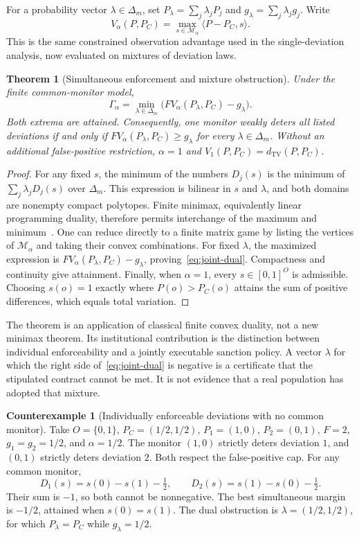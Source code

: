 \documentclass[11pt,letterpaper]{article}
\theoremstyle{plain}
\newtheorem{theorem}[proposition]{Theorem}
\theoremstyle{definition}
\newtheorem{counterexample}[proposition]{Counterexample}
\theoremstyle{remark}
\newcommand{\TV}{d_{\mathrm{TV}}}
\begin{document}
For a probability vector $\lambda\in\Delta_m$, set $P_\lambda=\sum_j\lambda_jP_j$ and $g_\lambda=\sum_j\lambda_jg_j$. Write
\[
V_\alpha(P,P_C)=\max_{s\in\mathcal M_\alpha}\langle P-P_C,s\rangle.
\]
This is the same constrained observation advantage used in the single-deviation analysis, now evaluated on mixtures of deviation laws.

\begin{theorem}[Simultaneous enforcement and mixture obstruction]\label{thm:joint-enforcement}
Under the finite common-monitor model,
\begin{equation}\label{eq:joint-dual}
\Gamma_\alpha=\min_{\lambda\in\Delta_m}
\bigl(FV_\alpha(P_\lambda,P_C)-g_\lambda\bigr).
\end{equation}
Both extrema are attained. Consequently, one monitor weakly deters all listed deviations if and only if $FV_\alpha(P_\lambda,P_C)\geq g_\lambda$ for every $\lambda\in\Delta_m$. Without an additional false-positive restriction, $\alpha=1$ and $V_1(P,P_C)=\TV(P,P_C)$.
\end{theorem}
\begin{proof}
For any fixed $s$, the minimum of the numbers $D_j(s)$ is the minimum of $\sum_j\lambda_jD_j(s)$ over $\Delta_m$. This expression is bilinear in $s$ and $\lambda$, and both domains are nonempty compact polytopes. Finite minimax, equivalently linear programming duality, therefore permits interchange of the maximum and minimum~\cite{boydconvex}. One can reduce directly to a finite matrix game by listing the vertices of $\mathcal M_\alpha$ and taking their convex combinations. For fixed $\lambda$, the maximized expression is $FV_\alpha(P_\lambda,P_C)-g_\lambda$, proving~\eqref{eq:joint-dual}. Compactness and continuity give attainment. Finally, when $\alpha=1$, every $s\in[0,1]^O$ is admissible. Choosing $s(o)=1$ exactly where $P(o)>P_C(o)$ attains the sum of positive differences, which equals total variation.
\end{proof}

The theorem is an application of classical finite convex duality, not a new minimax theorem. Its institutional contribution is the distinction between individual enforceability and a jointly executable sanction policy. A vector $\lambda$ for which the right side of~\eqref{eq:joint-dual} is negative is a certificate that the stipulated contract cannot be met. It is not evidence that a real population has adopted that mixture.

\begin{counterexample}[Individually enforceable deviations with no common monitor]\label{ex:pairwise-enforcement}
Take $O=\{0,1\}$, $P_C=(1/2,1/2)$, $P_1=(1,0)$, $P_2=(0,1)$, $F=2$, $g_1=g_2=1/2$, and $\alpha=1/2$. The monitor $(1,0)$ strictly deters deviation $1$, and $(0,1)$ strictly deters deviation $2$. Both respect the false-positive cap. For any common monitor,
\[
D_1(s)=s(0)-s(1)-\tfrac12,
\qquad
D_2(s)=s(1)-s(0)-\tfrac12.
\]
Their sum is $-1$, so both cannot be nonnegative. The best simultaneous margin is $-1/2$, attained when $s(0)=s(1)$. The dual obstruction is $\lambda=(1/2,1/2)$, for which $P_\lambda=P_C$ while $g_\lambda=1/2$.
\end{counterexample}
\end{document}
